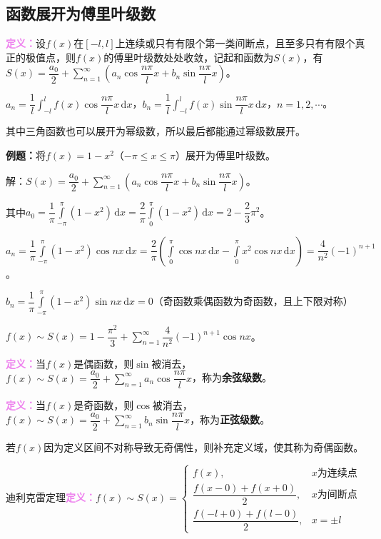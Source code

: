 \documentclass[UTF8, 12pt]{ctexart}
\begin{document}
\subsection{函数展开为傅里叶级数}

\textcolor{violet}{\textbf{定义：}}设$f(x)$在$[-l,l]$上连续或只有有限个第一类间断点，且至多只有有限个真正的极值点，则$f(x)$的傅里叶级数处处收敛，记起和函数为$S(x)$，有$S(x)=\dfrac{a_0}{2}+\sum\limits_{n=1}^\infty\left(a_n\cos\dfrac{n\pi}{l}x+b_n\sin\dfrac{n\pi}{l}x\right)$。

$\displaystyle{a_n=\dfrac{1}{l}\int_{-l}^lf(x)\cos\dfrac{n\pi}{l}x\,\textrm{d}x}$，$\displaystyle{b_n=\dfrac{1}{l}\int_{-l}^lf(x)\sin\dfrac{n\pi}{l}x\,\textrm{d}x}$，$n=1,2,\cdots$。

其中三角函数也可以展开为幂级数，所以最后都能通过幂级数展开。

\textbf{例题：}将$f(x)=1-x^2$（$-\pi\leqslant x\leqslant\pi$）展开为傅里叶级数。

解：$S(x)=\dfrac{a_0}{2}+\sum\limits_{n=1}^\infty\left(a_n\cos\dfrac{n\pi}{l}x+b_n\sin\dfrac{n\pi}{l}x\right)$。

其中$a_0=\dfrac{1}{\pi}\int\limits_{-\pi}^\pi(1-x^2)\,\textrm{d}x=\dfrac{2}{\pi}\int\limits_0^\pi(1-x^2)\,\textrm{d}x=2-\dfrac{2}{3}\pi^2$。

$a_n=\dfrac{1}{\pi}\int\limits_{-\pi}^\pi(1-x^2)\cos nx\,\textrm{d}x=\dfrac{2}{\pi}(\int\limits_0^\pi\cos nx\,\textrm{d}x-\int\limits_0^\pi x^2\cos nx\,\textrm{d}x)=\dfrac{4}{n^2}(-1)^{n+1}$。

$b_n=\dfrac{1}{\pi}\int\limits_{-\pi}^\pi(1-x^2)\sin nx\,\textrm{d}x=0$（奇函数乘偶函数为奇函数，且上下限对称）

$f(x)\sim S(x)=1-\dfrac{\pi^2}{3}+\sum\limits_{n=1}^\infty\dfrac{4}{n^2}(-1)^{n+1}\cos nx$。

\textcolor{violet}{\textbf{定义：}}当$f(x)$是偶函数，则$\sin$被消去，$f(x)\sim S(x)=\dfrac{a_0}{2}+\sum\limits_{n=1}^\infty a_n\cos\dfrac{n\pi}{l}x$，称为\textbf{余弦级数}。

\textcolor{violet}{\textbf{定义：}}当$f(x)$是奇函数，则$\cos$被消去，$f(x)\sim S(x)=\dfrac{a_0}{2}+\sum\limits_{n=1}^\infty b_n\sin\dfrac{n\pi}{l}x$，称为\textbf{正弦级数}。

若$f(x)$因为定义区间不对称导致无奇偶性，则补充定义域，使其称为奇偶函数。

迪利克雷定理\textcolor{violet}{\textbf{定义：}}$f(x)\sim S(x)=\left\{\begin{array}{ll}
    f(x), & x\text{为连续点} \\
    \dfrac{f(x-0)+f(x+0)}{2}, & x\text{为间断点} \\
    \dfrac{f(-l+0)+f(l-0)}{2}, & x=\pm l
\end{array}\right.$
\end{document}
